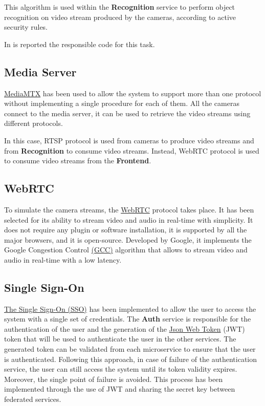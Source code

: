 \documentclass{scrartcl}
\begin{document}
    This algorithm is used within the \textbf{Recognition} service to perform object recognition on video stream produced by the cameras, according to active security rules.

    In  is reported the responsible code for this task.
    


    \subsection{Media Server}
    \href{https://github.com/bluenviron/mediamtx}{MediaMTX} has been used to allow the system to support more than one protocol without implementing a single procedure for each of them.
    All the cameras connect to the media server, it can be used to retrieve the video streams using different protocols.

    In this case, RTSP protocol is used from cameras to produce video streams and from \textbf{Recognition} to consume video streams.
    Instead, WebRTC protocol is used to consume video streams from the \textbf{Frontend}.

    \subsection{WebRTC}
    To simulate the camera streams, the \href{https://webrtc.org/}{WebRTC} protocol takes place.
    It has been selected for its ability to stream video and audio in real-time with simplicity.
    It does not require any plugin or software installation, it is supported by all the major browsers, and it is open-source.
    Developed by Google, it implements the Google Congestion Control \href{https://www.researchgate.net/publication/316684665_Congestion_Control_for_Real-Time_Communication}{(GCC)} algorithm that allows to stream video and audio in real-time with a low latency.

    \subsection{Single Sign-On}
    \href{https://en.wikipedia.org/wiki/Single_sign-on}{The Single Sign-On (SSO)} has been implemented to allow the user to access the system with a single set of credentials.
    The \textbf{Auth} service is responsible for the authentication of the user and the generation of the \href{https://jwt.io/}{Json Web Token} (JWT) token that will be used to authenticate the user in the other services.
    The generated token can be validated from each microservice to ensure that the user is authenticated.
    Following this approach, in case of failure of the authentication service, the user can still access the system until its token validity expires.
    Moreover, the single point of failure is avoided.
    This process has been implemented through the use of JWT and sharing the secret key between federated services.
\end{document}
